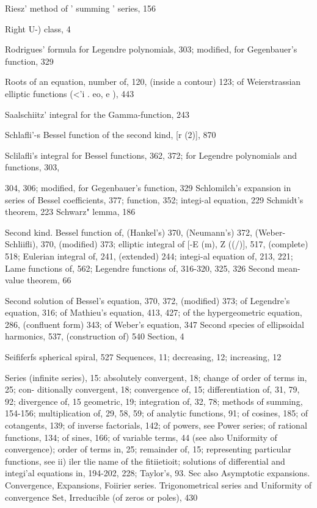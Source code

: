 Riesz' method of ' summing ' series, 156

Right  U-) class, 4

Rodrigues' formula for Legendre polynomials, 303; modified, for Gegenbauer's function, 329

Roots of an equation, number of, 120, (inside a contour) 123; of Weierstrassian elliptic
functions (<'i . eo, e ), 443

Saalschiitz' integral for the Gamma-function, 243

Schlafli'-s Bessel function of the second kind, [r  (2)], 870

Sclilafli's integral for Bessel functions, 362, 372; for Legendre polynomials and functions, 303,

304, 306; modified, for Gegenbauer's function, 329
Schlomilch's expansion in series of Bessel coefficients, 377; function, 352; integi-al equation, 229
Schmidt's theorem, 223
Schwarz" lemma, 186

Second kind. Bessel function of, (Hankel's) 370, (Neumann's) 372, (Weber-Schliifli), 370,
(modified) 373; elliptic integral of [-E (m), Z ((/)], 517, (complete) 518; Eulerian integral of,
241, (extended) 244; integi-al equation of, 213, 221; Lame functions of, 562; Legendre
functions of, 316-320, 325, 326
Second mean-value theorem, 66

Second solution of Bessel's equation, 370, 372, (modified) 373; of Legendre's equation, 316; of
Mathieu's equation, 413, 427; of the hypergeometric equation, 286, (confluent form) 343; of
Weber's equation, 347
Second species of ellipsoidal harmonics, 537, (construction of) 540
Section, 4

Seififerfs spherical spiral, 527
Sequences, 11; decreasing, 12; increasing, 12

Series (infinite series), 15: absolutely convergent, 18; change of order of terms in, 25; con-
ditionally convergent, 18; convergence of, 15; differentiation of, 31, 79, 92; divergence of,
15  geometric, 19; integration of, 32, 78; methods of summing, 154-156; multiplication
of, 29, 58, 59; of analytic functions, 91; of cosines, 185; of cotangents, 139; of inverse
factorials, 142; of powers, see Power series; of rational functions, 134; of sines, 166; of
variable terms, 44 (see also Uniformity of convergence); order of terms in, 25; remainder of,
15; representing particular functions, see ii) iler tlie name of the fitiietioit; solutions of
differential and integi'al equations in, 194-202, 228; Taylor's, 93. Sec also Asymptotic
expansions. Convergence, Expansions, Foiirier series. Trigonometrical series and Uniformity
of convergence
Set, Irreducible (of zeros or poles), 430

